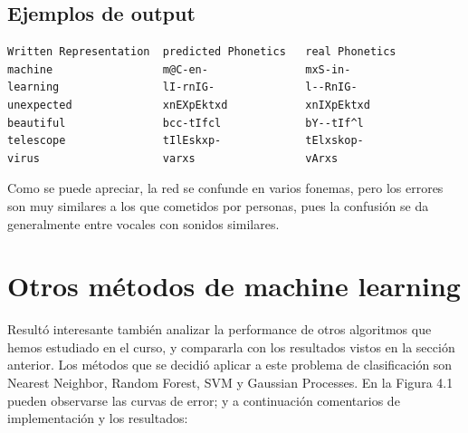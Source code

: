 \documentclass[paper=a4, fontsize=11pt]{scrartcl} %
\numberwithin{equation}{section} %
\numberwithin{figure}{section} %
\numberwithin{table}{section} %
\begin{document}
\subsection{Ejemplos de output}

\begin{center}
\begin{BVerbatim}
Written Representation  predicted Phonetics   real Phonetics  
machine                 m@C-en-               mxS-in-  
learning                lI-rnIG-              l--RnIG- 
unexpected              xnEXpEktxd            xnIXpEktxd  
beautiful               bcc-tIfcl             bY--tIf^l 
telescope               tIlEskxp-             tElxskop- 
virus                   varxs                 vArxs

\end{BVerbatim}
\end{center}


Como se puede apreciar, la red se confunde en varios fonemas, pero los errores son muy similares a los que cometidos por personas, pues la confusión se da generalmente entre vocales con sonidos similares. \\

\section{ Otros métodos de machine learning }


Resultó interesante también analizar la performance de otros algoritmos que hemos estudiado en el curso, y compararla con los resultados vistos en la sección anterior. Los métodos que se decidió aplicar a este problema de clasificación son Nearest Neighbor, Random Forest, SVM y Gaussian Processes. En la Figura 4.1 pueden observarse las curvas de error; y a continuación comentarios de implementación y los resultados:
\end{document}
